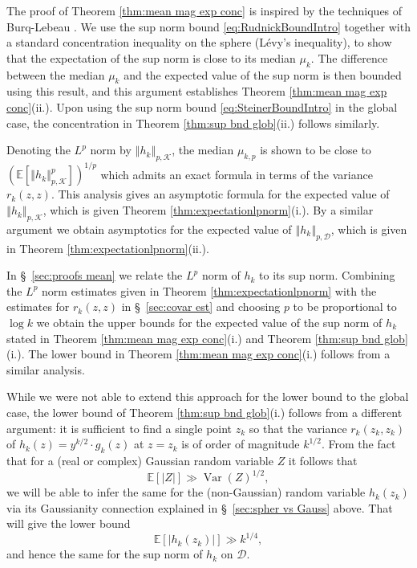 \documentclass[12pt, a4paper]{amsart}
\theoremstyle{definition}
\newcommand {\E} {\mathbb{E}}
\newcommand {\1} {\mathbf{1}}
\newcommand {\Dc} {\mathcal{D}}
\newcommand {\Kc} {\mathcal{K}}
\newcommand{\var}{\operatorname{Var}}
\numberwithin{equation}{section}
\begin{document}
The proof of Theorem \ref{thm:mean mag exp conc} is inspired by the techniques of Burq-Lebeau \cite{BurqLebeau}. We use the sup norm bound \eqref{eq:RudnickBoundIntro} together with a standard concentration inequality on the sphere (L\'evy's inequality), to show that the expectation of the sup norm is close to its median $\mu_{k}$. The difference between the median $\mu_k$ and the expected value of the sup norm is then bounded using this result, and this argument 
establishes Theorem \ref{thm:mean mag exp conc}(ii.).  Upon using the sup norm bound \eqref{eq:SteinerBoundIntro} in the global case, the concentration in Theorem \ref{thm:sup bnd glob}(ii.) follows similarly.

Denoting the $L^p$ norm by $\left\Vert h_{k}\right\Vert _{p,\Kc}$, the median $\mu_{k,p}$ is shown to be close to $\left(\mathbb{E}\left[\left\Vert h_{k}\right\Vert _{p,\Kc}^{p}\right]\right)^{1/p}$ which admits an exact formula in terms of the variance $r_k(z,z)$.  This analysis gives an asymptotic formula for the expected value of $\left\Vert h_{k}\right\Vert _{p,\Kc}$, which is given Theorem \ref{thm:expectationlpnorm}(i.). By a similar argument we obtain asymptotics for the expected value of $\left\Vert h_{k}\right\Vert _{p,\Dc}$, which is given in Theorem \ref{thm:expectationlpnorm}(ii.).

In \S~\ref{sec:proofs mean} we relate the $L^p$ norm of $h_k$ to its sup norm. Combining the $L^p$ norm estimates given in Theorem \ref{thm:expectationlpnorm} with the estimates for $r_k(z,z)$ in \S~\ref{sec:covar est} and choosing $p$ to be proportional to $\log k$ we obtain the upper bounds for the expected value of the sup norm of $h_k$ stated in Theorem \ref{thm:mean mag exp conc}(i.) and Theorem \ref{thm:sup bnd glob}(i.). The lower bound in Theorem \ref{thm:mean mag exp conc}(i.) follows from a similar analysis. 


\vspace{2mm}

While we were not able to extend this approach for the lower bound to the global case, the lower bound of Theorem \ref{thm:sup bnd glob}(i.) follows from a different argument: it is sufficient to find a single point $z_{k}$ so that the variance $r_{k}(z_{k},z_{k})$ of $h_{k}(z)=y^{k/2}\cdot g_{k}(z)$ at $z=z_{k}$ is of order of magnitude $k^{1/2}$. From the fact that for a (real or complex) Gaussian random variable $Z$
it follows that $$\E\left[|Z|\right] \gg \var(Z)^{1/2},$$ we will be able to infer the same for the (non-Gaussian) random variable $h_{k}(z_{k})$ via its Gaussianity connection explained in \S~\ref{sec:spher vs Gauss} above. 
That will give the lower bound $$\E[|h_{k}(z_{k})|] \gg k^{1/4} , $$ and hence the same for the sup norm of $h_k$ on $\Dc$.
\end{document}
